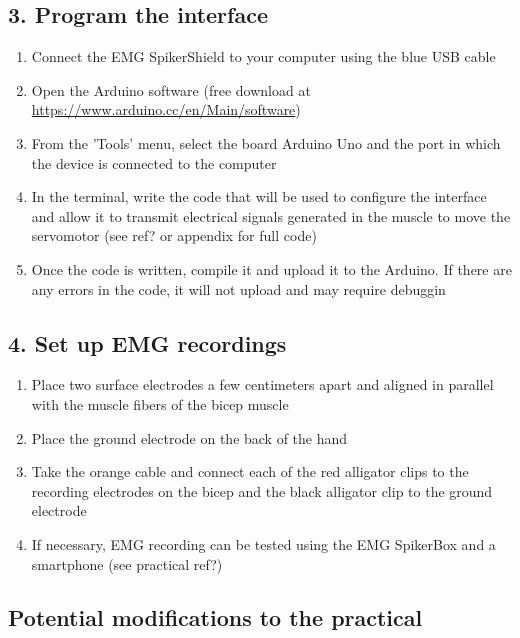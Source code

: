 \documentclass[12pt]{article}
\begin{document}
\subsection*{3. Program the interface}

\begin{enumerate}
\item Connect the EMG SpikerShield to your computer using the blue USB cable
\item Open the Arduino software (free download at \href{https://www.arduino.cc/en/Main/software}{https://www.arduino.cc/en/Main/software})
\item From the 'Tools' menu, select the board Arduino Uno and the port in which the device is connected to the computer 
\item In the terminal, write the code that will be used to configure the interface and allow it to transmit electrical signals generated in the muscle to move the servomotor (see ref? or appendix for full code)
\item Once the code is written, compile it and upload it to the Arduino. If there are any errors in the code, it will not upload and may require debuggin
\end{enumerate}

\subsection*{4. Set up EMG recordings}

\begin{enumerate}
\item Place two surface electrodes a few centimeters apart and aligned in parallel with the muscle fibers of the bicep muscle
\item Place the ground electrode on the back of the hand
\item Take the orange cable and connect each of the red alligator clips to the recording electrodes on the bicep and the black alligator clip to the ground electrode
\item If necessary, EMG recording can be tested using the EMG SpikerBox and a smartphone (see practical ref?) 
\end{enumerate}

\subsection*{}

\subsection*{Potential modifications to the practical}
\end{document}
